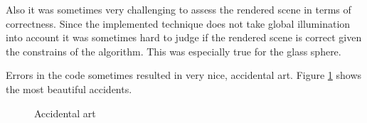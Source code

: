 \documentclass[sigconf, nonacm]{acmart}
\begin{document}
Also it was sometimes very challenging to assess the rendered scene in terms of correctness. Since the implemented technique does not take global illumination into
account it was sometimes hard to judge if the rendered scene is correct given the constrains of the algorithm. This was especially true for the glass sphere.

Errors in the code sometimes resulted in very nice, accidental art. Figure \ref{fig:art} shows the most beautiful accidents.


\begin{figure}[ht]
  \centering

  \caption{Accidental art}
  \label{fig:art}
  \end{figure}
\end{document}
